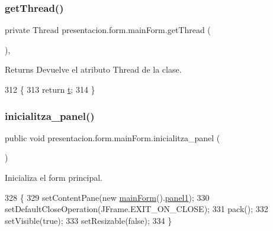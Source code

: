 \subsubsection{\texorpdfstring{get\+Thread()}{getThread()}}
{\footnotesize\ttfamily private Thread presentacion.\+form.\+main\+Form.\+get\+Thread (\begin{DoxyParamCaption}{ }\end{DoxyParamCaption})\hspace{0.3cm}{\ttfamily [inline]}, {\ttfamily [private]}}

\begin{DoxyReturn}{Returns}
Devuelve el atributo Thread de la clase. 
\end{DoxyReturn}

\begin{DoxyCode}
312                                \{
313         \textcolor{keywordflow}{return} \hyperlink{classpresentacion_1_1form_1_1mainForm_a4643a7a227b8b65874d63d33a5adfc33}{t};
314     \}
\end{DoxyCode}
\mbox{\label{classpresentacion_1_1form_1_1mainForm_aae4c847b58c5d50945fa1dd27d534319}} 
\subsubsection{\texorpdfstring{inicialitza\+\_\+panel()}{inicialitza\_panel()}}
{\footnotesize\ttfamily public void presentacion.\+form.\+main\+Form.\+inicialitza\+\_\+panel (\begin{DoxyParamCaption}{ }\end{DoxyParamCaption})\hspace{0.3cm}{\ttfamily [inline]}}



Inicializa el form principal. 


\begin{DoxyCode}
328                                     \{
329         setContentPane(\textcolor{keyword}{new} \hyperlink{classpresentacion_1_1form_1_1mainForm_ac1236f4bc250bf2f5a4a01a072e77555}{mainForm}().\hyperlink{classpresentacion_1_1form_1_1mainForm_aa43e009cc6dc09d4e637385fbd361510}{panel1});
330         setDefaultCloseOperation(JFrame.EXIT\_ON\_CLOSE);
331         pack();
332         setVisible(\textcolor{keyword}{true});
333         setResizable(\textcolor{keyword}{false});
334     \}
\end{DoxyCode}
\mbox{\label{classpresentacion_1_1form_1_1mainForm_a6eb9e9b4f7bb6da2c592a5a0294a6a06}} 
